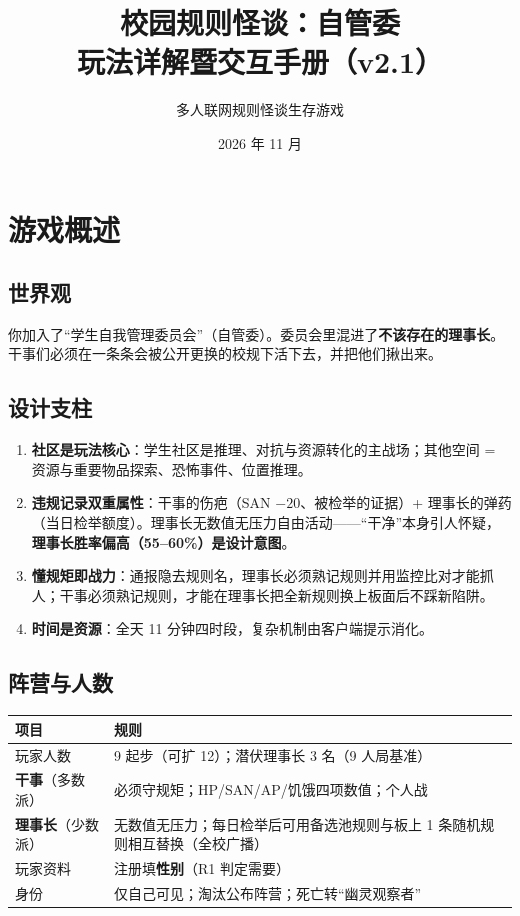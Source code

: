 \documentclass[UTF8, fontset=none, 11pt]{ctexart}
\title{\textbf{校园规则怪谈：自管委}\\[4pt]\Large 玩法详解暨交互手册（v2.1）}
\author{多人联网规则怪谈生存游戏}
\date{2026 年 11 月}
\begin{document}
\maketitle
\tableofcontents
\newpage

\section{游戏概述}
\subsection{世界观}
你加入了``学生自我管理委员会''（自管委）。委员会里混进了\textbf{不该存在的理事长}。干事们必须在一条条会被公开更换的校规下活下去，并把他们揪出来。

\subsection{设计支柱}
\begin{enumerate}
  \item \textbf{社区是玩法核心}：学生社区是推理、对抗与资源转化的主战场；其他空间 = 资源与重要物品探索、恐怖事件、位置推理。
  \item \textbf{违规记录双重属性}：干事的伤疤（SAN $-20$、被检举的证据）+ 理事长的弹药（当日检举额度）。理事长无数值无压力自由活动——``干净''本身引人怀疑，\textbf{理事长胜率偏高（55--60\%）是设计意图}。
  \item \textbf{懂规矩即战力}：通报隐去规则名，理事长必须熟记规则并用监控比对才能抓人；干事必须熟记规则，才能在理事长把全新规则换上板面后不踩新陷阱。
  \item \textbf{时间是资源}：全天 11 分钟四时段，复杂机制由客户端提示消化。
\end{enumerate}

\subsection{阵营与人数}
\begin{center}
\begin{tabular}{ll}
\toprule
项目 & 规则 \\
\midrule
玩家人数 & 9 起步（可扩 12）；潜伏理事长 3 名（9 人局基准） \\
\textbf{干事}（多数派） & 必须守规矩；HP/SAN/AP/饥饿四项数值；个人战 \\
\textbf{理事长}（少数派） & 无数值无压力；每日检举后可用备选池规则与板上 1 条随机规则相互替换（全校广播） \\
玩家资料 & 注册填\textbf{性别}（R1 判定需要） \\
身份 & 仅自己可见；淘汰公布阵营；死亡转``幽灵观察者'' \\
\bottomrule
\end{tabular}
\end{center}
\end{document}
